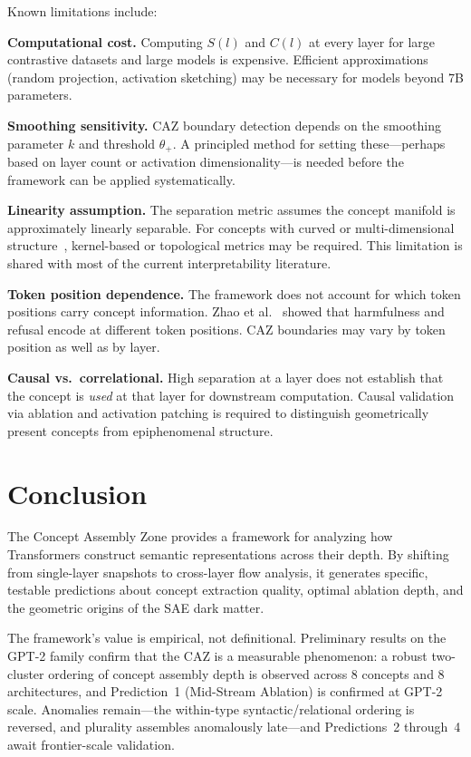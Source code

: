 \documentclass[11pt,a4paper]{article}
\begin{document}
Known limitations include:

\textbf{Computational cost.} Computing $S(l)$ and $C(l)$ at every layer for large
contrastive datasets and large models is expensive. Efficient approximations (random
projection, activation sketching) may be necessary for models beyond 7B parameters.

\textbf{Smoothing sensitivity.} CAZ boundary detection depends on the smoothing
parameter $k$ and threshold $\theta_+$. A principled method for setting these---perhaps
based on layer count or activation dimensionality---is needed before the framework
can be applied systematically.

\textbf{Linearity assumption.} The separation metric assumes the concept manifold
is approximately linearly separable. For concepts with curved or multi-dimensional
structure~\citep{gurnee2025manifolds, engels2025linear}, kernel-based or topological
metrics may be required. This limitation is shared with most of the current
interpretability literature.

\textbf{Token position dependence.} The framework does not account for which token
positions carry concept information. Zhao et al.~\citep{zhao2025harmfulness} showed
that harmfulness and refusal encode at different token positions. CAZ boundaries
may vary by token position as well as by layer.

\textbf{Causal vs.\ correlational.} High separation at a layer does not establish
that the concept is \emph{used} at that layer for downstream computation. Causal
validation via ablation and activation patching is required to distinguish
geometrically present concepts from epiphenomenal structure.

\section{Conclusion}
\label{sec:conclusion}

The Concept Assembly Zone provides a framework for analyzing how Transformers
construct semantic representations across their depth. By shifting from single-layer
snapshots to cross-layer flow analysis, it generates specific, testable predictions
about concept extraction quality, optimal ablation depth, and the geometric origins
of the SAE dark matter.

The framework's value is empirical, not definitional. Preliminary results on the
GPT-2 family confirm that the CAZ is a measurable phenomenon: a robust two-cluster
ordering of concept assembly depth is observed across 8 concepts and 8 architectures,
and Prediction~1 (Mid-Stream Ablation) is confirmed at GPT-2 scale. Anomalies
remain---the within-type syntactic/relational ordering is reversed, and plurality
assembles anomalously late---and Predictions~2 through~4 await frontier-scale
validation.
\end{document}

